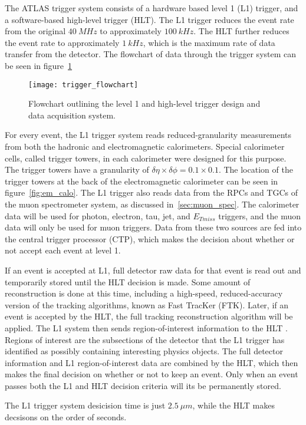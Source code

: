 The ATLAS trigger system consists of a hardware based level 1 (L1) trigger, and a software-based high-level trigger (HLT).
The L1 trigger reduces the event rate from the original $40~MHz$ to approximately $100~kHz$.
The HLT further reduces the event rate to approximately $1~kHz$, which is the maximum rate of data transfer from the detector.
The flowchart of data through the trigger system can be seen in figure~\ref{fig:trigger_flowchart}

\begin{figure}[!ht]\centering
\texttt{[image: trigger\_flowchart]}
\caption{Flowchart outlining the level 1 and high-level trigger design and data acquisition system.}
\label{fig:trigger_flowchart}
\end{figure}

For every event, the L1 trigger system reads reduced-granularity measurements from both the hadronic and electromagnetic calorimeters.
Special calorimeter cells, called trigger towers, in each calorimeter were designed for this purpose.
The trigger towers have a granularity of $\delta \eta \times \delta \phi = 0.1 \times 0.1$.
The location of the trigger towers at the back of the electromagnetic calorimeter can be seen in figure~\ref{fig:em_calo}.
The L1 trigger also reads data from the RPCs and TGCs of the muon spectrometer system, as discussed in~\ref{sec:muon_spec}.
The calorimeter data will be used for photon, electron, tau, jet, and $E_{Tmiss}$ triggers, and the muon data will only be used for muon triggers.
Data from these two sources are fed into the central trigger processor (CTP),
which makes the decision about whether or not accept each event at level 1.

If an event is accepted at L1, full detector raw data for that event is read out and temporarily stored until the HLT decision is made.
Some amount of reconstruction is done at this time, including a high-speed,
reduced-accuracy version of the tracking algorithms, known as Fast TracKer (FTK).
Later, if an event is accepted by the HLT, the full tracking reconstruction algorithm will be applied.
The L1 system then sends region-of-interest information to the HLT .
Regions of interest are the subsections of the detector that the L1 trigger has identified as possibly containing interesting physics objects.
The full detector information and L1 region-of-interest data are combined by the HLT,
which then makes the final decision on whether or not to keep an event.
Only when an event passes both the L1 and HLT decision criteria will its be permanently stored.

The L1 trigger system desicision time is just $2.5~\mu m$, while the HLT makes decsisons on the order of seconds.